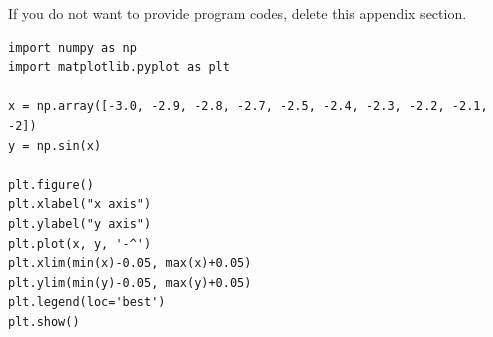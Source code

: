 \documentclass[12pt,a4paper]{article}
\begin{document}
If you do not want to provide program codes, delete this appendix section.
\\


\begin{minipage}{1\linewidth}
\small{
\begin{lstlisting}
import numpy as np
import matplotlib.pyplot as plt

x = np.array([-3.0, -2.9, -2.8, -2.7, -2.5, -2.4, -2.3, -2.2, -2.1, -2])
y = np.sin(x)

plt.figure()
plt.xlabel("x axis")
plt.ylabel("y axis")
plt.plot(x, y, '-^')
plt.xlim(min(x)-0.05, max(x)+0.05)
plt.ylim(min(y)-0.05, max(y)+0.05)
plt.legend(loc='best')
plt.show()
\end{lstlisting}
}
\end{minipage}
\end{document}
